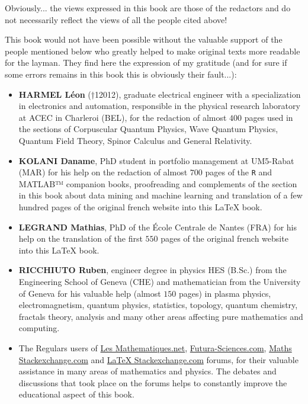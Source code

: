 	Obviously... the views expressed in this book are those of the redactors and do not necessarily reflect the views of all the people cited above!

	This book would not have been possible without the valuable support of the people mentioned below who greatly helped to make original texts more readable for the layman. They find here the expression of my gratitude (and for sure if some errors remains in this book this is obviously their fault...):
	
	\begin{itemize}		
		\item \textbf{HARMEL Léon} (†12012), graduate electrical engineer with a specialization in electronics and automation, responsible in the physical research laboratory at ACEC in Charleroi (BEL), for the redaction of almost $400$ pages used in the sections of Corpuscular Quantum Physics, Wave Quantum Physics, Quantum Field Theory, Spinor Calculus and General Relativity.
		
		\item \textbf{KOLANI Daname}, PhD student in portfolio management at UM5-Rabat (MAR) for his help on the redaction of almost $700$ pages of the \texttt{R} and MATLAB™ companion books, proofreading and complements of the section in this book about data mining and machine learning and translation of a few hundred pages of the original french website into this \LaTeX{} book.
		
		\item \textbf{LEGRAND Mathias}, PhD of the École Centrale de Nantes (FRA) for his help on the translation of the first $550$ pages of the original french website into this \LaTeX{} book.
		
		\item \textbf{RICCHIUTO Ruben}, engineer degree in physics HES (B.Sc.) from the Engineering School of Geneva (CHE) and mathematician from the University of Geneva for his valuable help (almost $150$ pages) in plasma physics, electromagnetism, quantum physics, statistics, topology, quantum chemistry, fractals theory, analysis and many other areas affecting pure mathematics and computing.
		
		\item The Regulars users of \href{https://les-mathematiques.net/}{{\color{blue} Les Mathematiques.net}}, \href{http://www.futura-sciences.com}{{\color{blue} Futura-Sciences.com}}, \href{https://math.stackexchange.com}{{\color{blue} Maths Stackexchange.com}} and \href{https://tex.stackexchange.com/}{{\color{blue} LaTeX Stackexchange.com}} forums, for their valuable assistance in many areas of mathematics and physics. The debates and discussions that took place on the forums helps to constantly improve the educational aspect of this book.
		

\end{itemize}
